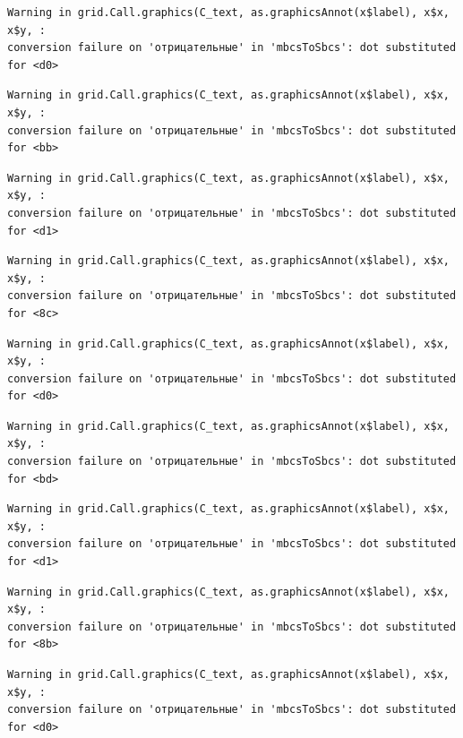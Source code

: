 \documentclass[
  letterpaper,
]{scrbook}
\theoremstyle{definition}
\theoremstyle{remark}
\begin{document}
\begin{verbatim}
Warning in grid.Call.graphics(C_text, as.graphicsAnnot(x$label), x$x, x$y, :
conversion failure on 'отрицательные' in 'mbcsToSbcs': dot substituted for <d0>
\end{verbatim}

\begin{verbatim}
Warning in grid.Call.graphics(C_text, as.graphicsAnnot(x$label), x$x, x$y, :
conversion failure on 'отрицательные' in 'mbcsToSbcs': dot substituted for <bb>
\end{verbatim}

\begin{verbatim}
Warning in grid.Call.graphics(C_text, as.graphicsAnnot(x$label), x$x, x$y, :
conversion failure on 'отрицательные' in 'mbcsToSbcs': dot substituted for <d1>
\end{verbatim}

\begin{verbatim}
Warning in grid.Call.graphics(C_text, as.graphicsAnnot(x$label), x$x, x$y, :
conversion failure on 'отрицательные' in 'mbcsToSbcs': dot substituted for <8c>
\end{verbatim}

\begin{verbatim}
Warning in grid.Call.graphics(C_text, as.graphicsAnnot(x$label), x$x, x$y, :
conversion failure on 'отрицательные' in 'mbcsToSbcs': dot substituted for <d0>
\end{verbatim}

\begin{verbatim}
Warning in grid.Call.graphics(C_text, as.graphicsAnnot(x$label), x$x, x$y, :
conversion failure on 'отрицательные' in 'mbcsToSbcs': dot substituted for <bd>
\end{verbatim}

\begin{verbatim}
Warning in grid.Call.graphics(C_text, as.graphicsAnnot(x$label), x$x, x$y, :
conversion failure on 'отрицательные' in 'mbcsToSbcs': dot substituted for <d1>
\end{verbatim}

\begin{verbatim}
Warning in grid.Call.graphics(C_text, as.graphicsAnnot(x$label), x$x, x$y, :
conversion failure on 'отрицательные' in 'mbcsToSbcs': dot substituted for <8b>
\end{verbatim}

\begin{verbatim}
Warning in grid.Call.graphics(C_text, as.graphicsAnnot(x$label), x$x, x$y, :
conversion failure on 'отрицательные' in 'mbcsToSbcs': dot substituted for <d0>
\end{verbatim}
\end{document}
